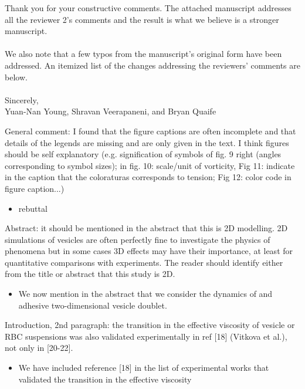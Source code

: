 \documentclass[11pt]{article}
\newcommand{\comment}[1]{{\color{blue} #1}}
\begin{document}
\noindent
Thank you for your constructive comments.  The attached manuscript
addresses all the reviewer 2's comments and the result is what we
believe is a stronger manuscript.
\\ \\ \noindent 
We also note that a few typos from the manuscript’s original form have
been addressed. An itemized list of the changes addressing the
reviewers’ comments are below.
\\ \\ \noindent 
Sincerely, \\ \noindent
Yuan-Nan Young, Shravan Veerapaneni, and Bryan Quaife

\vspace{20pt}
\noindent
\comment{General comment: I found that the figure captions are often
incomplete and that details of the legends are missing and are only
given in the text. I think figures should be self explanatory (e.g.
signification of symbols of fig. 9 right (angles corresponding to symbol
sizes); in fig. 10: scale/unit of vorticity, Fig 11: indicate in the
caption that the coloraturas corresponds to tension; Fig 12: color code
in figure caption...)}
\begin{itemize}
  \item rebuttal
\end{itemize}

\noindent
\comment{Abstract: it should be mentioned in the abstract that this is
2D modelling. 2D simulations of vesicles are often perfectly fine to
investigate the physics of phenomena but in some cases 3D effects may
have their importance, at least for quantitative comparisons with
experiments. The reader should identify either from the title or
abstract that this study is 2D.}
\begin{itemize}
  \item We now mention in the abstract that we consider the dynamics of
    and adhesive two-dimensional vesicle doublet.
\end{itemize}

\noindent
\comment{Introduction, 2nd paragraph: the transition in the effective
viscosity of vesicle or RBC suspensions was also validated
experimentally in ref [18] (Vitkova et al.), not only in [20-22].}
\begin{itemize}
  \item We have included reference [18] in the list of experimental
    works that validated the transition in the effective viscosity
\end{itemize}
\end{document}

